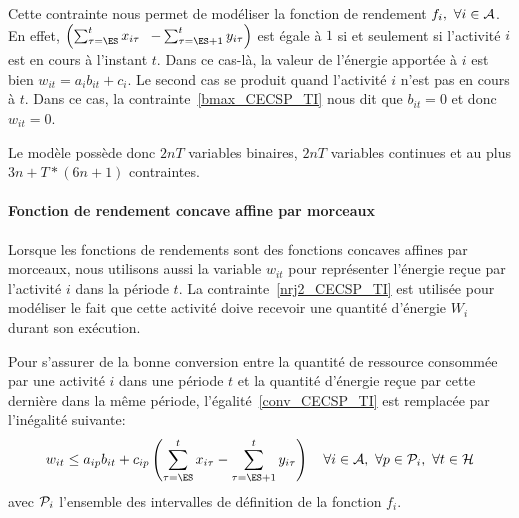 Cette contrainte nous permet de modéliser la fonction de rendement
$f_i,\ \forall i \in \A$. En effet, $\left(\sum_{\tau=\ES}^t
x_{i\tau}\right.$ $\left.-\sum_{\tau=\ES+1}^t y_{i\tau}\right) $ est égale à $1$ si et
seulement si l'activité $i$ est en cours à l'instant $t$.  Dans ce
cas-là, la valeur de l'énergie apportée à $i$ est bien
$w_{it}=a_ib_{it}+c_i$. Le second cas se produit quand l'activité $i$
n'est pas en cours à $t$. Dans ce cas, la
contrainte~\eqref{bmax_CECSP_TI} nous dit que $b_{it}=0$ et donc
$w_{it}=0$.

Le modèle possède donc $2nT$ variables binaires, $2nT$ variables
continues et au plus $3n+T*(6n+1)$ contraintes.

\paragraph{Fonction de rendement concave affine par morceaux}

Lorsque les fonctions de rendements sont des fonctions concaves
affines par morceaux, nous utilisons aussi la variable $w_{it}$ pour
représenter l'énergie reçue par l'activité $i$ dans la période $t$. La
contrainte~\eqref{nrj2_CECSP_TI} est utilisée pour modéliser le fait
que cette activité doive recevoir une quantité d'énergie $W_i$ durant
son exécution. 

Pour s'assurer de la bonne conversion entre la quantité de ressource
consommée par une activité $i$ dans une période $t$ et la quantité
d'énergie reçue par cette dernière dans la même période,
l'égalité~\eqref{conv_CECSP_TI} est remplacée par l'inégalité
suivante: 
\begin{equation}
w_{it} \le a_{ip}b_{it} + c_{ip}\left(\sum_{\tau=\ES}^t
x_{i\tau}-\sum_{\tau=\ES+1}^t y_{i\tau}\right) \quad  \forall i \in
\A,\ \forall p \in \P_i,\ \forall t \in \H 
\label{conv_CECSP_TI2}
\end{equation}
avec $\P_i$ l'ensemble des intervalles de définition de la fonction
$f_i$.

